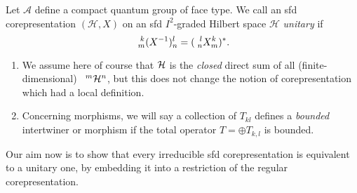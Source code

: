 
\begin{Def} Let $\mathscr{A}$ define a compact quantum group of face type. We call an sfd corepresentation $(\mathcal{H},X)$ on an sfd $I^2$-graded Hilbert space $\mathcal{H}$
\emph{unitary} if \[\Gr{(X^{-1})}{k}{l}{m}{n}=(\Gr{X}{l}{k}{n}{m})^{*}.\]  
\end{Def} 
\begin{Rem} \begin{enumerate} \item We assume here of course that $\Hsp$ is the \emph{closed} direct sum of all (finite-dimensional) $\Gru{\Hsp}{m}{n}$, but this does not change the notion of corepresentation which had a local definition.
\item Concerning morphisms, we will say a collection of $T_{kl}$ defines a \emph{bounded} intertwiner or morphism if the total operator $T= \oplus T_{k,l}$ is bounded.
\end{enumerate}
\end{Rem}

Our aim now is to show that every irreducible sfd corepresentation is
equivalent to a unitary one, by embedding it into a restriction of the
regular corepresentation.

